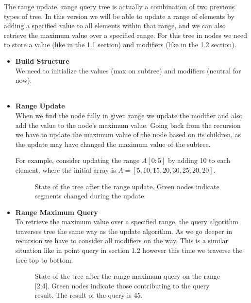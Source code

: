\documentclass{article}
\begin{document}
The range update, range query tree is actually a combination of two previous types of tree.
In this version we will be able to update a range of elements by adding a specified value to all elements within that range, and we can also retrieve the maximum value over a specified range.
For this tree in nodes we need to store a value (like in the 1.1 section) and modifiers (like in the 1.2 section).


\begin{itemize}
    \item \textbf{Build Structure} \\
    We need to initialize the values (max on subtree) and modifiers (neutral for now). \\
     \\

    \item \textbf{Range Update} \\
    When we find the node fully in given range we update the modifier and also add the value to the node's maximum value.
    Going back from the recursion we have to update the maximum value of the node based on its children, as the update may have changed the maximum value of the subtree.
     \\

    \FloatBarrier

    For example, consider updating the range \( A[0:5] \) by adding 10 to each element, where the initial array is \( A = [5, 10, 15, 20, 30, 25, 20, 20] \).

    \begin{figure}[H]
        \centering
        
        \caption{State of the tree after the range update. Green nodes indicate segments changed during the update.}
        \label{fig:segment_tree_4}
    \end{figure}

    \item \textbf{Range Maximum Query} \\
    To retrieve the maximum value over a specified range, the query algorithm traverses tree the same way as the update algorithm.
    As we go deeper in recursion we have to consider all modifiers on the way. This is a similar situation like in point query in section 1.2 however this time we traverse the tree top to bottom.
    

    \begin{figure}[H]
        \centering
        
        \caption{State of the tree after the range maximum query on the range [2:4]. Green nodes indicate those contributing to the query result. The result of the query is 45.}
        \label{fig:segment_tree_5}
    \end{figure}

\end{itemize}
\end{document}
